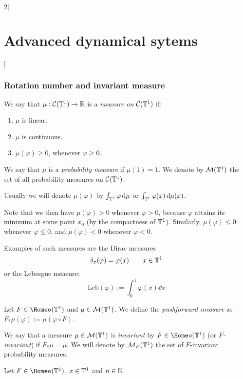 \documentclass[../../../main_math.tex]{subfiles}
\begin{document}
\begin{multicols}{2}[\section{Advanced dynamical sytems}]
  \subsubsection{Rotation number and invariant measure}
  \begin{definition}
    We say that $\mu:\mathcal{C}(\mathbb{T}^1)\to\mathbb{R}$ is a \emph{measure on $\mathcal{C}(\mathbb{T}^1)$} if:
    \begin{enumerate}
      \item $\mu$ is linear.
      \item $\mu$ is continuous.
      \item $\mu(\varphi)\geq 0$, whenever $\varphi\geq 0$.
    \end{enumerate}
    We say that $\mu$ is a \emph{probability measure} if $\mu(1)=1$. We denote by $\mathcal{M}(\mathbb{T}^1)$ the set of all probability measures on $\mathcal{C}(\mathbb{T}^1)$.
  \end{definition}
  \begin{remark}
    Usually we will denote $\mu(\varphi)$ by $\int_{\mathbb{T}^1}\varphi\dd{\mu}$ or $\int_{\mathbb{T}^1}\varphi(x)\dd{\mu(x)}$.
  \end{remark}
  \begin{remark}
    Note that we then have $\mu(\varphi)>0$ whenever $\varphi>0$, because $\varphi$ attains its minimum at some point $x_0$ (by the compactness of $\mathbb{T}^1$). Similarly, $\mu(\varphi)\leq 0$ whenever $\varphi\leq 0$, and $\mu(\varphi)<0$ whenever $\varphi<0$.
  \end{remark}
  \begin{remark}
    Examples of such measures are the Dirac measures
    $$\delta_x(\varphi)=\varphi(x)\qquad x\in \mathbb{T}^1$$
    or the Lebesgue measure:
    $$\text{Leb}(\varphi):=\int_{0}^1\varphi(x)\dd{x}$$
  \end{remark}
  \begin{definition}
    Let $F\in \Homeo(\TT^1)$ and $\mu\in \mathcal{M}(\mathbb{T}^1)$. We define the \emph{pushforward measure} as $F_*\mu(\varphi):=\mu(\varphi\circ F)$.
  \end{definition}
  \begin{definition}
    We say that a measure $\mu\in\mathcal{M}(\mathbb{T}^1)$ is \emph{invariant} by $F\in\Homeo(\TT^1)$ (or \emph{$F$-invariant}) if $F_*\mu=\mu$. We will denote by $\mathcal{M}_F(\mathbb{T}^1)$ the set of $F$-invariant probability measures.
  \end{definition}
  \begin{proposition}
    Let $F\in \Homeo(\TT^1)$, $x\in\mathbb{T}^1$ and $n\in\mathbb{N}$.
    \begin{itemize}

\end{itemize}
\end{proposition}
\end{multicols}
\end{document}
